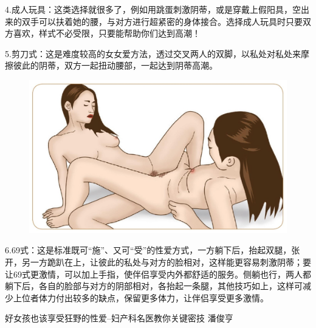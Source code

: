 \documentclass[12pt,UTF8]{ctexbook}
\begin{document}
4.成人玩具：这类选择就很多了，例如用跳蛋刺激阴蒂，或是穿戴上假阳具，空出来的双手可以扶着她的腰，与对方进行超紧密的身体接合。选择成人玩具时只要双方喜欢，样式不必受限，只要能帮助你们达到高潮！

5.剪刀式：这是难度较高的女女爱方法，透过交叉两人的双脚，以私处对私处来摩擦彼此的阴蒂，双方一起扭动腰部，一起达到阴蒂高潮。

\begin{figure}[H]
	\centering
	\includegraphics[width=0.7\linewidth]{12}
	\caption{}
	\label{fig:1}
\end{figure}

6.69式：这是标准既可“施”、又可“受”的性爱方式，一方躺下后，抬起双腿，张开，另一方跪趴在上，让彼此的私处与对方的脸相对，这样能更容易刺激阴蒂；要让69式更激情，可以加上手指，使伴侣享受内外都舒适的服务。侧躺也行，两人都躺下后，各自的脸部与对方的阴部相对，各抬起一条腿，其他技巧如上，这样可减少上位者体力付出较多的缺点，保留更多体力，让伴侣享受更多激情。

\backmatter

好女孩也该享受狂野的性爱--妇产科名医教你关键密技  潘俊亨
\end{document}
